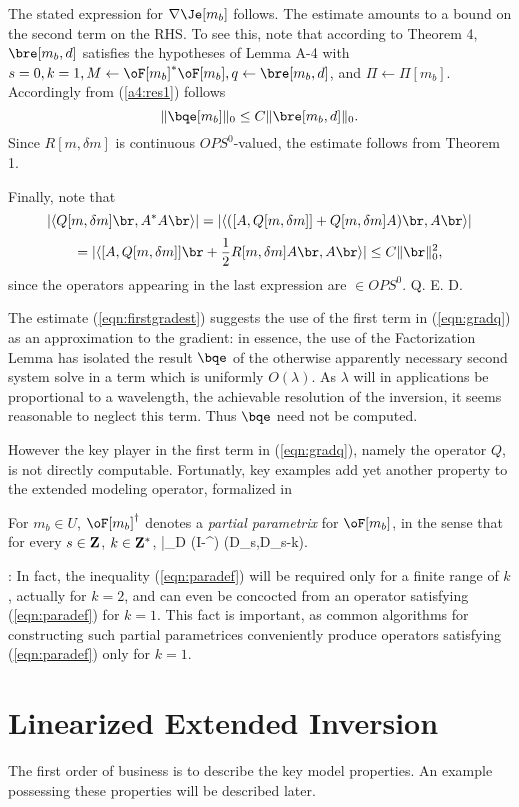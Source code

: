 The stated expression for $\nabla \Je[m_b]$ follows. The estimate amounts to a bound on the second term on the RHS. To see this, note that according to Theorem 4, $\bre[m_b,d]$ satisfies the hypotheses of Lemma A-4 with $s=0, k=1, M \leftarrow \oF[m_b]^*\oF[m_b], q \leftarrow \bre[m_b,d]$, and $\Pi \leftarrow \Pi[m_b]$. Accordingly from (\ref{a4:res1}) follows
\[
\|\bqe[m_b]\|_0 \le C\|\bre[m_b,d]\|_0.
\]
Since $R[m,\delta m]$ is continuous $OPS^0$-valued, the estimate follows from Theorem 1.

Finally, note that
\[
|\langle Q[m,\delta m]\br,A^*A \br\rangle| = |\langle ([A,Q[m,\delta m]]+Q[m,\delta m]A)\br,A\br\rangle|
\]
\[
=|\langle[A,Q[m,\delta m]]\br+\frac{1}{2}R[m,\delta m]A\br,A\br\rangle| \le C\|\br\|_0^2,
\]
since the operators appearing in the last expression are $\in OPS^0$.
Q. E. D.

The estimate (\ref{eqn:firstgradest}) suggests the use of the first
term in (\ref{eqn:gradq}) as an approximation to the gradient: in
essence, the use of the Factorization Lemma has isolated the result
$\bqe$ of the otherwise apparently necessary second system solve in a
term which is uniformly $O(\lambda)$. As $\lambda$ will in
applications be proportional to a wavelength, the achievable
resolution of the inversion, it seems reasonable to neglect this
term. Thus $\bqe$ need not be computed.

However the key player in the first term in (\ref{eqn:gradq}), namely
the operator $Q$, is not directly computable. Fortunatly, key examples
add yet another property to the extended modeling operator, formalized
in 

 For $m_b \in U$, $\oF[m_b]^{\dagger}$
denotes a {\em partial parametrix} for $\oF[m_ b]$, in the sense that
for every $s \in \bf{Z}$, $k \in \bf{Z}^*$,
\be
\label{eqn:paradef}
\bar{\Pi}_D (I-\oF[m_b]\oF[m_b]^{\dagger}) (D_s,D_{s-k}).
\ee

: In fact, the inequality (\ref{eqn:paradef}) will be required only for 
a finite range of $k$, actually for $k=2$, and can even be concocted
from an operator satisfying (\ref{eqn:paradef}) for $k=1$. This fact
is important, as common algorithms for constructing such partial
parametrices conveniently produce operators satisfying
(\ref{eqn:paradef}) only for $k=1$. %


\section{Linearized Extended Inversion}
The first order of business is to describe the key model
properties. An example possessing these properties will be described
later.

